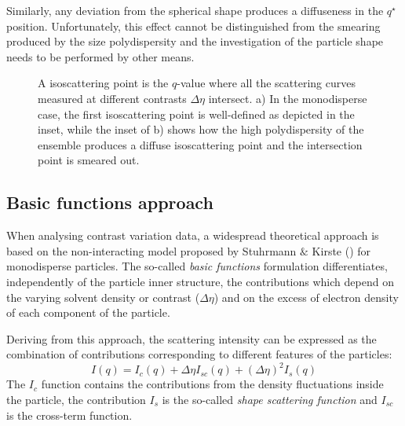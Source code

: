 Similarly, any deviation from the spherical shape produces a diffuseness in the $q^{\star}$ position. Unfortunately, this effect cannot be distinguished from the smearing produced by the size polydispersity and the investigation of the particle shape needs to be performed by other means.

\begin{figure}%
	\centering
		\qquad
		\subfloat[Polydisperse ensemble: $p_d=30\;\%$]{\resizebox{0.45\linewidth}{!}{\figfont{12pt}}\label{fig:IsopointSimulationPolydisperse}}
	\caption[Isoscattering points and particle polydispersity.]{A isoscattering point is the $q$-value where all the scattering curves measured at different contrasts $\Delta \eta$ intersect. a) In the monodisperse case, the first isoscattering point is well-defined as depicted in the inset, while the inset of b) shows how the high polydispersity of the ensemble produces a diffuse isoscattering point and the intersection point is smeared out.}
\end{figure}

\subsection{Basic functions approach}
\label{sec:basic_functions_theory}
When analysing contrast variation data, a widespread theoretical approach is based on the non-interacting model proposed by Stuhrmann $\&$ Kirste (\citeyear{stuhrmann_elimination_1965,stuhrmann_elimination_1967}) for monodisperse particles. The so-called \emph{basic functions} formulation differentiates, independently of the particle inner structure, the contributions which depend on the varying solvent density or contrast (\(\Delta\eta\)) and on the excess of electron density of each component of the particle.

Deriving from this approach, the scattering intensity can be expressed as the combination of contributions corresponding to different features of the particles:
\begin{equation}
\label{eq:intensity_contrast}
I(q)=I_c(q)+\Delta\eta I_{sc}(q)+(\Delta\eta)^2 I_{s}(q)
\end{equation}
The $I_c$ function contains the contributions from the density fluctuations inside the particle, the contribution $I_s$ is the so-called \emph{shape scattering function} and $I_{sc}$ is the cross-term function.

